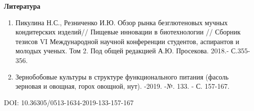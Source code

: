 \begin{center}
{\bfseries Литература}
\end{center}

\begin{references}
\begin{enumerate}
\def\labelenumi{\arabic{enumi}.}
\item
  Пикулина Н.С., Резниченко И.Ю. Обзор рынка безглютеновых мучных
  кондитерских изделий// Пищевые инновации в биотехнологии // Сборник
  тезисов VI Международной научной конференции студентов, аспирантов и
  молодых ученых. Том 2. Под общей редакцией А.Ю. Просекова. 2018.-
  С.355-356.
\item
  Зернобобовые культуры в структуре функционального питания (фасоль
  зерновая и овощная, горох овощной, нут). -2019. -№. 133. - С. 157-167.
\end{enumerate}

DOI: 10.36305/0513-1634-2019-133-157-167


\end{references}
